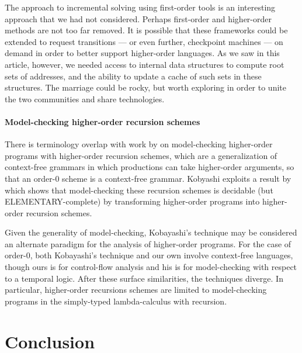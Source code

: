 The approach to incremental solving using first-order tools is an interesting approach that we had not considered.
Perhaps first-order and higher-order methods are not too far removed.
It is possible that these frameworks could be extended to request transitions --- or even further, checkpoint machines --- on demand in order to better support higher-order languages.
As we saw in this article, however, we needed access to internal data structures to compute root sets of addresses, and the ability to update a cache of such sets in these structures.
The marriage could be rocky, but worth exploring in order to unite the two communities and share technologies.

\paragraph{Model-checking higher-order recursion schemes}
There is terminology overlap with work by
\citet{mattmight:Kobayashi:2009:HORS} on model-checking higher-order
programs with higher-order recursion schemes, which are a
generalization of context-free grammars in which productions can take
higher-order arguments, so that an order-0 scheme is a context-free
grammar.
Kobyashi exploits a result by \citet{dvanhorn:Ong2006ModelChecking} which
shows that model-checking these recursion schemes is decidable (but
ELEMENTARY-complete) by transforming higher-order programs into
higher-order recursion schemes.

Given the generality of model-checking, Kobayashi's technique may be
considered an alternate paradigm for the analysis of
higher-order programs.
For the case of order-0, both Kobayashi's technique and our own
involve context-free languages, though ours is for control-flow
analysis and his is for model-checking with respect to a temporal
logic.
After these surface similarities, the techniques diverge.
In particular, higher-order recursions schemes are limited
to model-checking programs in the simply-typed 
lambda-calculus with recursion.


















\section{Conclusion}

